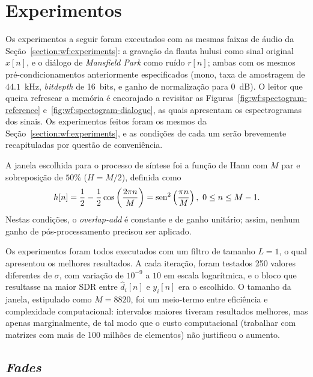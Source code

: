 \section{Experimentos}
\label{section:correntropy:experiments}

Os experimentos a seguir foram executados com as mesmas faixas de áudio da Seção~\ref{section:wf:experiments}: a gravação da flauta hulusi como sinal original $x[n]$, e o diálogo de \textit{Mansfield Park} como ruído $r[n]$; ambas com os mesmos pré-condicionamentos anteriormente especificados (mono, taxa de amostragem de $44.1$~kHz, \textit{bitdepth} de 16~bits, e ganho de normalização para 0~dB). O leitor que queira refrescar a memória é encorajado a revisitar as Figuras~\ref{fig:wf:spectogram-reference} e~\ref{fig:wf:spectogram-dialogue}, as quais apresentam os espectrogramas dos sinais. Os experimentos feitos foram os mesmos da Seção~\ref{section:wf:experiments}, e as condições de cada um serão brevemente recapituladas por questão de conveniência.

A janela escolhida para o processo de síntese foi a função de Hann com $M$ par e sobreposição de $50\%$ ($H = M/2$), definida como
\begin{equation}
    h[n] = \frac{1}{2} - \frac{1}{2}\cos\left(\frac{2\pi n}{M}\right) = \operatorname{sen}^2\left( \frac{\pi n}{M} \right),\ 0 \leq n \leq M-1.
\end{equation}
Nestas condições, o \textit{overlap-add} é constante e de ganho unitário; assim, nenhum ganho de pós-processamento precisou ser aplicado.

Os experimentos foram todos executados com um filtro de tamanho $L = 1$, o qual apresentou os melhores resultados. A cada iteração, foram testados 250 valores diferentes de $\sigma$, com variação de $10^{-9}$ a $10$ em escala logarítmica, e o bloco que resultasse na maior SDR entre $\hat{d}_i[n]$ e $y_i[n]$ era o escolhido. O tamanho da janela, estipulado como $M = 8820$, foi um meio-termo entre eficiência e complexidade computacional: intervalos maiores tiveram resultados melhores, mas apenas marginalmente, de tal modo que o custo computacional (trabalhar com matrizes com mais de 100 milhões de elementos) não justificou o aumento.

\subsection{\textit{Fades}}


